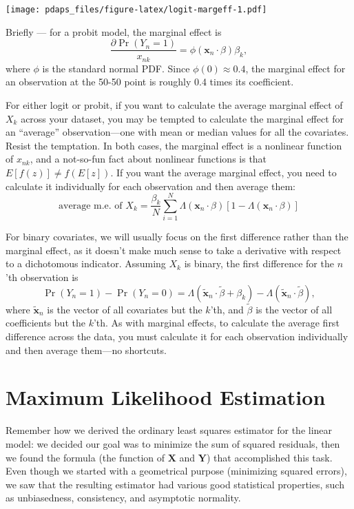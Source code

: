 \documentclass[
  12pt,
  oneside,openany]{book}
\begin{document}
\texttt{[image: pdaps\_files/figure-latex/logit-margeff-1.pdf]}

Briefly --- for a probit model, the marginal effect is
\[
\frac{\partial \Pr(Y_n = 1)}{x_{nk}} = \phi(\mathbf{x}_n \cdot \beta) \beta_k,
\]
where \(\phi\) is the standard normal PDF.
Since \(\phi(0) \approx 0.4\), the marginal effect for an observation at the 50-50 point is roughly 0.4 times its coefficient.

For either logit or probit, if you want to calculate the average marginal effect of \(X_k\) across your dataset, you may be tempted to calculate the marginal effect for an ``average'' observation---one with mean or median values for all the covariates.
Resist the temptation.
In both cases, the marginal effect is a nonlinear function of \(x_{nk}\), and a not-so-fun fact about nonlinear functions is that \(E[f(z)] \neq f(E[z])\).
If you want the average marginal effect, you need to calculate it individually for each observation and then average them:
\[
\text{average m.e. of $X_k$}
= \frac{\beta_k}{N} \sum_{i=1}^N \Lambda(\mathbf{x}_n \cdot \beta) [1 - \Lambda(\mathbf{x}_n \cdot \beta)]
\]

For binary covariates, we will usually focus on the first difference rather than the marginal effect, as it doesn't make much sense to take a derivative with respect to a dichotomous indicator.
Assuming \(X_k\) is binary, the first difference for the \(n\)'th observation is
\[
\Pr(Y_n = 1) - \Pr(Y_n = 0) =
\Lambda(\tilde{\mathbf{x}}_n \cdot \tilde{\beta} + \beta_k)
- \Lambda(\tilde{\mathbf{x}}_n \cdot \tilde{\beta}),
\]
where \(\tilde{\mathbf{x}}_n\) is the vector of all covariates but the \(k\)'th, and \(\tilde{\beta}\) is the vector of all coefficients but the \(k\)'th.
As with marginal effects, to calculate the average first difference across the data, you must calculate it for each observation individually and then average them---no shortcuts.

\hypertarget{maximum-likelihood-estimation}{%
\section{Maximum Likelihood Estimation}\label{maximum-likelihood-estimation}}

Remember how we derived the ordinary least squares estimator for the linear model: we decided our goal was to minimize the sum of squared residuals, then we found the formula (the function of \(\mathbf{X}\) and \(\mathbf{Y}\)) that accomplished this task.
Even though we started with a geometrical purpose (minimizing squared errors), we saw that the resulting estimator had various good statistical properties, such as unbiasedness, consistency, and asymptotic normality.
\end{document}
